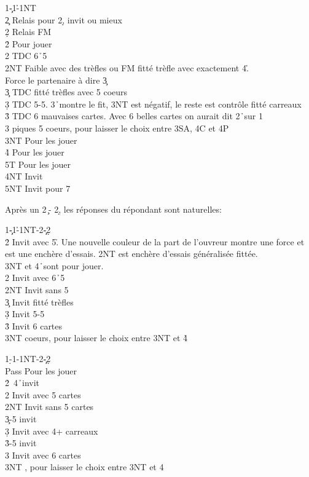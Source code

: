 \documentclass[a4paper]{article}
\begin{document}
\begin{bidtable}
1\c-1\h-1NT\+\\
2\c \> Relais pour 2\d , invit ou mieux\\
2\d \> Relais FM\\
2\h \> Pour jouer\\
2\s \> TDC 6\h\ 5\s \\
2NT \> Faible avec des trèfles ou FM fitté trèfle avec exactement 4\h .\+\\
Force \> le partenaire à dire 3\c \-\\
3\c \> TDC fitté trèfles avec 5 coeurs\\
3\d \> TDC 5-5. 3\h\ montre le fit, 3NT est négatif, le reste est contrôle fitté carreaux\\
3\h \> TDC 6 mauvaises cartes. Avec 6 belles cartes on aurait dit 2\h\ sur 1\c \\
3\s {} piques 5 coeurs, pour laisser le choix entre 3SA, 4C et 4P\\
3NT \> Pour les jouer\\
4\h \> Pour les jouer\\
5T \> Pour les jouer\\
4NT \> Invit\\
5NT \> Invit pour 7\-
\end{bidtable}

Après un 2\c\ - 2\d , les réponses du répondant sont naturelles:

\begin{bidtable}
1\c-1\h-1NT-2\c-2\d\+\\
2\h \> Invit avec 5\h . Une nouvelle couleur de la part de l'ouvreur montre une force et\\
\>est une enchère d'essais. 2NT est enchère d'essais généralisée fittée.\\
\>3NT et 4\h\ sont pour jouer.\\
2\s \> Invit avec 6\h\ 5\s \\
2NT \> Invit sans 5\h \\
3\c \> Invit fitté trèfles\\
3\d \> Invit 5-5\\
3\h \> Invit 6 cartes\\
3NT  coeurs, pour laisser le choix entre 3NT et 4\h \-
\end{bidtable}

\begin{bidtable}
1\d-1\s-1NT-2\c-2\d\+\\
Pass \> Pour les jouer\\
2\h {}\s\ 4\h\ invit\\
2\s \> Invit avec 5 cartes\\
2NT \> Invit sans 5 cartes\\
3\c {}-5 invit\\
3\d \> Invit avec 4+ carreaux\\
3\h {}-5 invit\\
3\s \> Invit avec 6 cartes\\
3NT \s , pour laisser le choix entre 3NT et 4\s \-
\end{bidtable}
\end{document}
